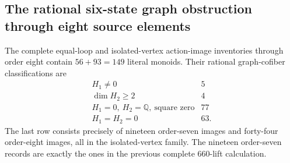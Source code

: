 \subsection{The rational six-state graph obstruction through eight source elements}

\begin{lemma}
\label{C:six-state-rational-images-eight}
The complete equal-loop and isolated-vertex action-image inventories
through order eight contain $56+93=149$ literal monoids.  Their
rational graph-cofiber classifications are
\[
\begin{array}{c|r}
H_1\ne0&5\\
\dim H_2\geq2&4\\
H_1=0,\ H_2=\mathbb Q,\ \text{square zero}&77\\
H_1=H_2=0&63.
\end{array}
\]
The last row consists precisely of nineteen order-seven images
and forty-four order-eight images, all in the isolated-vertex family.
The nineteen order-seven records are exactly the ones in the
previous complete $660$-lift calculation.
\end{lemma}
